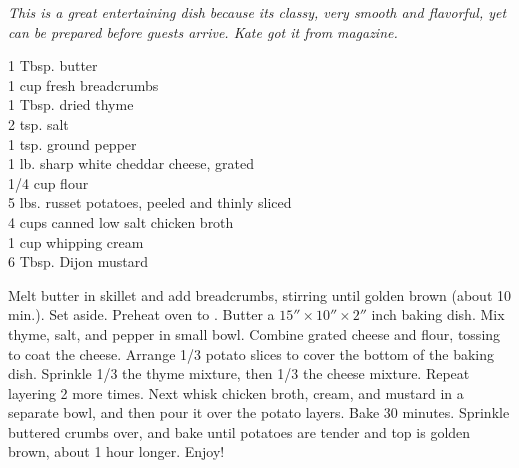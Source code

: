 \textit{This is a great entertaining dish because its classy, very smooth and
flavorful, yet can be prepared before guests arrive. Kate got it from}
 \textit{magazine.}
\begin{ingredients}
1 Tbsp. butter\\
1 cup fresh breadcrumbs\\
1 Tbsp. dried thyme\\
2 tsp. salt\\
1 tsp. ground pepper\\
1 lb. sharp white cheddar cheese, grated\\
1/4 cup flour\\
5 lbs. russet potatoes, peeled and thinly sliced\\
4 cups canned low salt chicken broth\\
1 cup whipping cream\\
6 Tbsp. Dijon mustard
\end{ingredients}
 Melt butter in skillet and add breadcrumbs, stirring until golden brown (about
10 min.). Set aside. Preheat oven to . Butter a 
$15''\times 10''\times 2''$ inch baking
dish. Mix thyme, salt, and  pepper in small bowl. Combine grated cheese and
flour, tossing to coat the cheese. Arrange 1/3 potato slices to cover the
bottom of the baking dish. Sprinkle 1/3 the thyme mixture, then 1/3 the
cheese mixture. Repeat layering 2 more times.  Next whisk chicken broth,
cream, and mustard in a separate bowl, and then pour it over the potato
layers. Bake 30 minutes. Sprinkle buttered crumbs over, and bake until
potatoes are tender and top is golden brown, about 1 hour longer.  Enjoy!    
